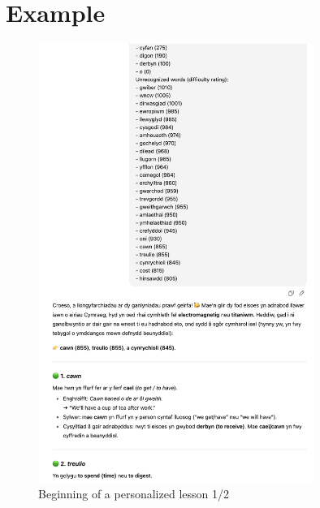 \section{Example}
\begin{figure}[h]
    \centering
    \includegraphics[width=0.8\textwidth]{figures/lesson-1.png}
    \caption{Beginning of a personalized lesson 1/2}
    \label{fig:lesson1}
\end{figure}
